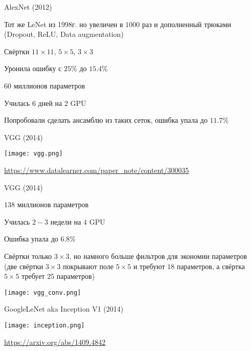 \documentclass[notes,12pt, aspectratio=169]{beamer}
\newenvironment{wideitemize}{\itemize\addtolength{\itemsep}{10pt}}{\enditemize}
\begin{document}
\begin{frame}{AlexNet (2012)}
\begin{wideitemize}
\item Тот же LeNet из 1998г. но увеличен в $1000$ раз и дополненный трюками (Dropout, ReLU, Data augmentation) 
\item Свёртки $11 \times 11$, $5 \times 5$, $3 \times 3$
\item  Уронила ошибку с $25\%$ до $15.4\%$ 
\item  $60$ миллионов параметров 
\item  Училась $6$ дней на $2$ GPU 
\item Попробовали сделать ансамблю из таких сеток, ошибка упала до $11.7\%$
\end{wideitemize}
\end{frame}


\begin{frame}{VGG (2014)}
\begin{center}
\texttt{[image: vgg.png]}
\end{center}
\vfill %
\footnotesize
\color{blue} \url{https://www.datalearner.com/paper_note/content/300035}
\end{frame}


\begin{frame}{VGG (2014)}
\begin{wideitemize}
\item  $138$ миллионов параметров
\item  Училась $2-3$ недели на $4$ GPU 
\item Ошибка упала до $6.8\%$
\item Свёртки только $3 \times 3$, но намного больше фильтров для экономии параметров (две свёртки $3\times 3$ покрывают поле $5 \times 5$ и требуют $18$ параметров, а свёртка $5 \times 5$ требует $25$ параметров)
\begin{center}
\texttt{[image: vgg\_conv.png]}
\end{center}
\end{wideitemize}
\end{frame}


\begin{frame}{GoogleLeNet aka Inception V1  (2014)}
\begin{center}
\texttt{[image: inception.png]}
\end{center}
\vfill %
\footnotesize
\color{blue} \url{https://arxiv.org/abs/1409.4842}
\end{frame}
\end{document}

